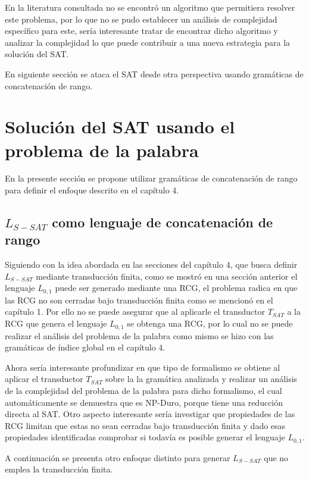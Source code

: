\documentclass[12pt]{article}
\begin{document}
En la literatura consultada no se encontró un algoritmo que permitiera resolver este problema, por lo que no se pudo establecer
un análisis de complejidad específico para este, sería interesante tratar de encontrar dicho algoritmo y analizar
la complejidad lo que puede contribuir a una nueva estrategia para la solución del SAT.

En siguiente sección se ataca el SAT desde otra perspectiva usando gramáticas de concatenación de rango.

\section{Solución del SAT usando el problema de la palabra}

En la presente sección se propone utilizar gramáticas de concatenación de rango para definir el enfoque descrito en el
capítulo 4.

\subsection{$L_{S-SAT}$ como lenguaje de concatenación de rango}

Siguiendo con la idea abordada en las secciones del capítulo 4, que busca definir $L_{S-SAT}$ mediante transducción finita,
como se mostró en una sección anterior el lenguaje $L_{0,1}$ puede ser generado mediante una RCG, el problema radica en que las RCG
no son cerradas bajo transducción finita como se mencionó en el capítulo 1. Por ello no se puede asegurar que al aplicarle el
transductor $T_{SAT}$ a la RCG que genera el lenguaje $L_{0,1}$ se obtenga una RCG, por lo cual no se puede realizar el análisis
del problema de la palabra como mismo se hizo con las gramáticas de índice global en el capítulo 4.

Ahora sería interesante profundizar en que tipo de formalismo se obtiene al aplicar el transductor $T_{SAT}$ sobre la
la gramática analizada y realizar un análisis de la complejidad del problema de la palabra para dicho formalismo, el cual
automáticamente se demuestra que es NP-Duro, porque tiene una reducción directa al SAT. Otro aspecto interesante
sería investigar que propiedades de las RCG limitan que estas no sean cerradas bajo transducción finita y dado esas
propiedades identificadas comprobar si todavía es posible generar el lenguaje $L_{0,1}$.

A continuación se presenta otro enfoque distinto para generar $L_{S-SAT}$ que no emplea la transducción finita.
\end{document}
